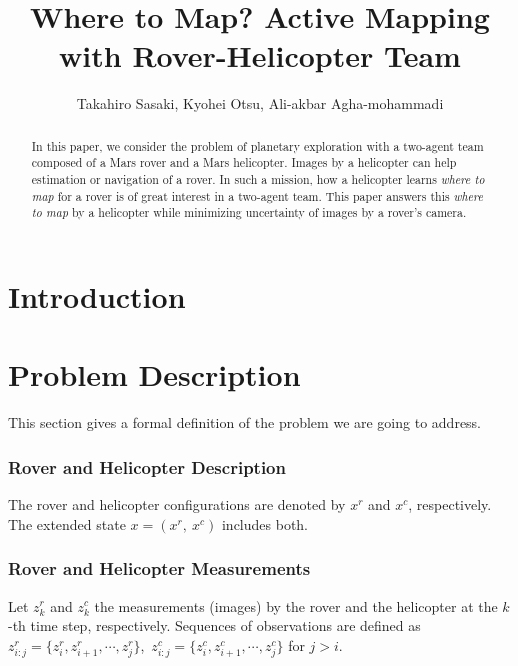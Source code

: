 \documentclass[conference]{IEEEtran}
\begin{document}
\title{\huge Where to Map? Active Mapping with Rover-Helicopter Team}

\author{Takahiro Sasaki, Kyohei Otsu, Ali-akbar Agha-mohammadi}

\maketitle

\begin{abstract}
In this paper, we consider the problem of planetary exploration with a two-agent team composed of a Mars rover and a Mars helicopter. Images by a helicopter can help estimation or navigation of a rover. In such a mission, how a helicopter learns {\it where to map} for a rover is of great interest in a two-agent team. 
This paper answers this {\it where to map} by a helicopter while minimizing uncertainty of images by a rover’s camera.
\end{abstract}

\IEEEpeerreviewmaketitle

\section{Introduction}


\section{Problem Description}
This section gives a formal definition of the problem we are going to address. 

\subsubsection*{Rover and Helicopter Description}
The rover and helicopter configurations are denoted by $x^r$ and $x^c$, respectively. The extended state $x=(x^r,~x^c)$ includes both.

\subsubsection*{Rover and Helicopter Measurements}
Let $z^r_k$ and $z^c_k$ the measurements (images) by the rover and the helicopter at the $k$-th time step, respectively. Sequences of observations are defined as $z^r_{i:j}=\{z^r_i,z^r_{i+1},\cdots,z^r_j\}$,~$z^c_{i:j}=\{z^c_i,z^c_{i+1},\cdots,z^c_j\}$ for $j>i$.
\end{document}
